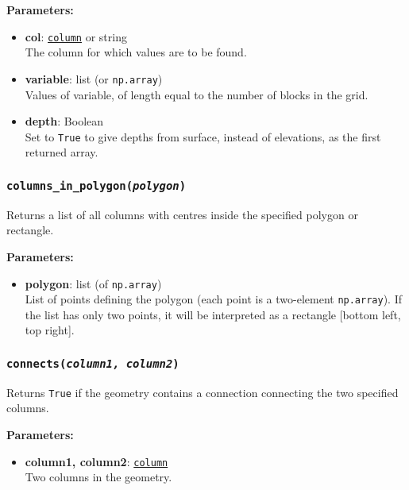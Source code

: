 \textbf{Parameters:}
\begin{itemize}
\item \textbf{col}: \hyperref[columnobjects]{\texttt{column}} or string\\
  The column for which values are to be found.
\item \textbf{variable}: list (or \texttt{np.array})\\
  Values of variable, of length equal to the number of blocks in the grid.
\item \textbf{depth}: Boolean\\
  Set to \texttt{True} to give depths from surface, instead of elevations, as the first returned array.
\end{itemize}

\begin{snugshade}\subsubsection{\texttt{columns\_in\_polygon(\emph{polygon})}}\end{snugshade}
\label{sec:mulgrid:columns_in_polygon}

Returns a list of all columns with centres inside the specified polygon or rectangle.

\textbf{Parameters:}
\begin{itemize}
\item \textbf{polygon}: list (of \texttt{np.array})\\
  List of points defining the polygon (each point is a two-element \texttt{np.array}).  If the list has only two points, it will be interpreted as a rectangle [bottom left, top right].
\end{itemize}

\begin{snugshade}\subsubsection{\texttt{connects(\emph{column1, column2})}}\end{snugshade}
\label{sec:mulgrid:connects}

Returns \texttt{True} if the geometry contains a connection connecting the two specified columns.

\textbf{Parameters:}
\begin{itemize}
\item \textbf{column1, column2}: \hyperref[columnobjects]{\texttt{column}}\\
  Two columns in the geometry.
\end{itemize}

